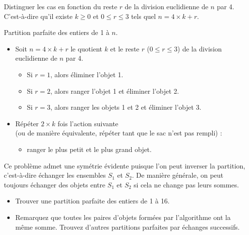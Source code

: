 \documentclass[11pt]{article}
\begin{document}
  \begin{indice}
    Distinguer les cas en fonction du reste $r$ de la division euclidienne de $n$ par 4. C'est-à-dire qu'il existe $k \geq 0$ et $0 \leq r \leq 3$ tels quel $n = 4 \times k + r$.
  \end{indice}


  \begin{algorithme}{Partition parfaite des entiers de 1 à $n$.}
    \begin{itemize}
    \item Soit $n = 4 \times k + r$ le quotient $k$ et le reste $r$ ($0 \leq r \leq 3$) de la division euclidienne de $n$ par 4.
      \begin{itemize}
      \item Si $r=1$, alors éliminer l'objet 1.
      \item Si $r=2$, alors ranger l'objet 1 et éliminer l'objet 2.
      \item Si $r=3$, alors ranger les objets 1 et 2 et éliminer l'objet 3.
      \end{itemize}
  \item Répéter $2 \times k$ fois l'action suivante \\ (ou de manière équivalente, répéter tant que le sac n'est pas rempli) :
    \begin{itemize}
    \item ranger le plus petit et le plus grand objet.
    \end{itemize}
  \end{itemize}
  \end{algorithme}

\begin{remarque}{}
    Ce problème admet une symétrie évidente puisque l'on peut inverser la partition, c'est-à-dire échanger les ensembles $S_1$ et $S_2$.
    De manière générale, on peut toujours échanger des objets entre $S_1$ et $S_2$ si cela ne change pas leurs sommes.
  \end{remarque}


\begin{exercice}{}
  \begin{itemize}
  \item Trouver une partition parfaite des entiers de 1 à 16.
  \item Remarquez que toutes les paires d'objets formées par l'algorithme ont la même somme.
    Trouvez d'autres partitions parfaites par échanges successifs.
  \end{itemize}

\end{exercice}
\end{document}
